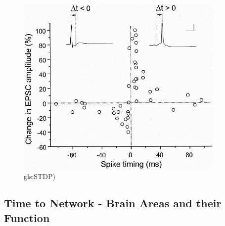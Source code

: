 \documentclass[]{article}
\begin{document}
\begin{figure}[H]
	\caption[\acrfull{gls:STDP}]{\acrfull{gls:STDP})\cite{bi2001synaptic}}
	\includegraphics[width=0.9\textwidth]{stdp}
\end{figure}



\subsection{Time to Network - Brain Areas and their Function}
\end{document}
